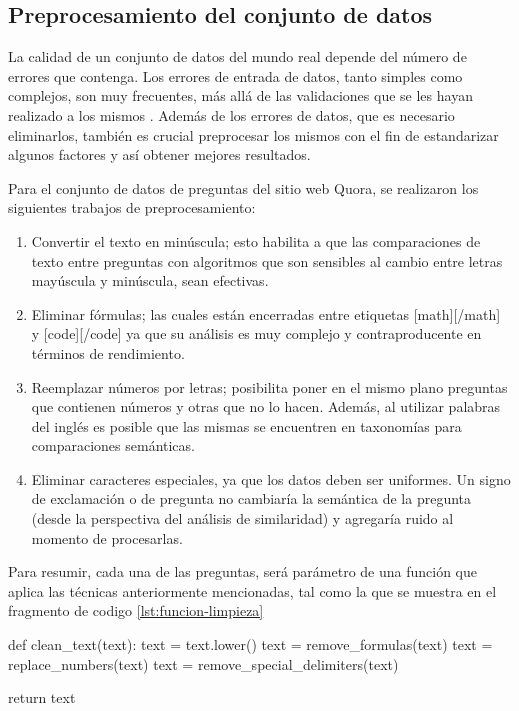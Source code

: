 \subsection{Preprocesamiento del conjunto de datos}

La calidad de un conjunto de datos del mundo real depende del número de errores que contenga. Los errores de entrada de datos, tanto simples como complejos, son muy frecuentes, más allá de las validaciones que se les hayan realizado a los mismos \citep{maletic2000data}. Además de los errores de datos, que es necesario eliminarlos, también es crucial preprocesar los mismos con el fin de estandarizar algunos factores y así obtener mejores resultados.

\bigskip Para el conjunto de datos de preguntas del sitio web Quora, se realizaron los siguientes trabajos de preprocesamiento:

\begin{enumerate}
	\item Convertir el texto en minúscula; esto habilita a que las comparaciones de texto entre preguntas con algoritmos que son sensibles al cambio entre letras mayúscula y minúscula, sean efectivas.
	\item Eliminar fórmulas; las cuales están encerradas entre etiquetas [math][/math] y [code][/code] ya que su análisis es muy complejo y contraproducente en términos de rendimiento.
	\item Reemplazar números por letras; posibilita poner en el mismo plano preguntas que contienen números y otras que no lo hacen. Además, al utilizar palabras del inglés es posible que las mismas se encuentren en taxonomías para comparaciones semánticas.
	\item Eliminar caracteres especiales, ya que los datos deben ser uniformes. Un signo de exclamación o de pregunta no cambiaría la semántica de la pregunta (desde la perspectiva del análisis de similaridad) y agregaría ruido al momento de procesarlas.
\end{enumerate}

Para resumir, cada una de las preguntas, será parámetro de una función que aplica las técnicas anteriormente mencionadas, tal como la que se muestra en el fragmento de codigo \ref{lst:funcion-limpieza}

\bigskip

\begin{python}[caption={Ejemplo de función de limpieza.}, captionpos=b,label={lst:funcion-limpieza}]
def clean_text(text):
	text = text.lower()
	text = remove_formulas(text)
	text = replace_numbers(text)
	text = remove_special_delimiters(text)

	return text
\end{python}


